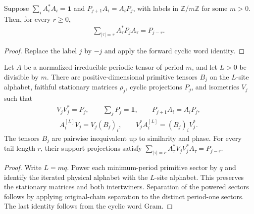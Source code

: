 \begin{lemma}
    \label{thm:inverse_cyclic_word_gram}
    \leanok
    Suppose $\sum_i A_i^*A_i=\mathbf1$ and
    $P_{j+1}A_i=A_iP_j$, with labels in $\mathbb Z/m\mathbb Z$ for some
    $m>0$.
    Then, for every $r\geq0$,
    \begin{align}
        \sum_{|\tau|=r}A_\tau^*P_jA_\tau=P_{j-r}.
    \end{align}
\end{lemma}
\begin{proof}\leanok
    Replace the label $j$ by $-j$ and apply the forward cyclic word identity.
\end{proof}

\begin{lemma}
    \label{thm:powered_cyclic_primitive_resolution}
    \leanok
    Let $A$ be a normalized irreducible periodic tensor of period $m$, and let
    $L>0$ be divisible by $m$. There are positive-dimensional primitive tensors
    $B_j$ on the $L$-site alphabet, faithful stationary matrices $\rho_j$,
    cyclic projections $P_j$, and isometries $V_j$ such that
    \begin{align}
        V_jV_j^*=P_j,\qquad \sum_jP_j=\mathbf1,\qquad
        P_{j+1}A_i=A_iP_j,
    \end{align}
    \begin{align}
        A^{[L]}_iV_j=V_j(B_j)_i,\qquad
        V_j^*A^{[L]}_i=(B_j)_iV_j^*.
    \end{align}
    The tensors $B_j$ are pairwise inequivalent up to similarity and phase.
    For every tail length $r$, their support projections satisfy
    $\sum_{|\tau|=r}A_\tau^*V_jV_j^*A_\tau=P_{j-r}$.
\end{lemma}
\begin{proof}\leanok
    Write $L=mq$. Power each minimum-period primitive sector by $q$ and identify
    the iterated physical alphabet with the $L$-site alphabet. This preserves
    the stationary matrices and both intertwiners. Separation of the powered
    sectors follows by applying original-chain separation to the distinct
    period-one sectors. The last identity follows from the cyclic word Gram.
\end{proof}

